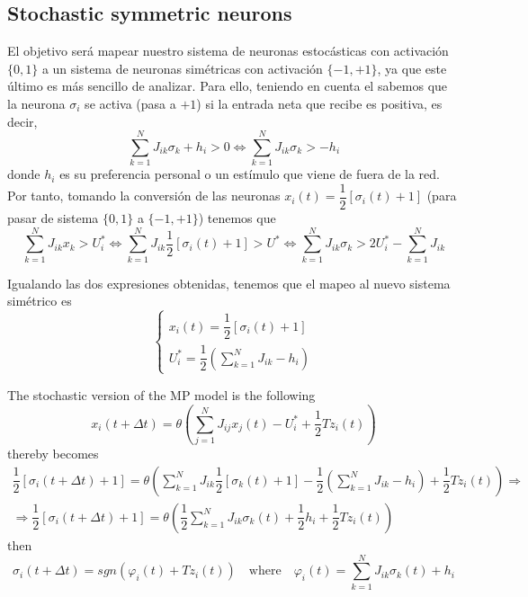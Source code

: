 \subsection{Stochastic symmetric neurons}
El objetivo será mapear nuestro sistema de neuronas estocásticas con activación $\{0,1\}$ a un sistema de neuronas simétricas con activación $\{-1, +1\}$, ya que este último es más sencillo de analizar. Para ello, teniendo en cuenta el  sabemos que la neurona $\sigma_i$ se activa (pasa a $+1$) si la entrada neta que recibe es positiva, es decir, 
\begin{equation*}
    \sum\limits_{k=1}^{N} J_{ik} \sigma_k  +h_i>0 \Longleftrightarrow \sum\limits_{k=1}^{N} J_{ik} \sigma_k > -h_i
\end{equation*}
donde $h_i$ es su preferencia personal o un estímulo que viene de fuera de la red. Por tanto, tomando la conversión de las neuronas $x_i(t) = \dfrac{1}{2}[\sigma_i(t)+1]$ (para pasar de sistema $\{0,1\}$ a $\{-1,+1\}$) tenemos que
\begin{equation*}
    \sum\limits_{k=1}^{N} J_{ik} x_k > U_i^* \iff \sum\limits_{k=1}^{N} J_{ik} \dfrac{1}{2}[\sigma_i(t)+1] > U^* \Longleftrightarrow \sum\limits_{k=1}^{N} J_{ik} \sigma_k > 2U_i^* - \sum\limits_{k=1}^{N} J_{ik}
\end{equation*}

\noindent
Igualando las dos expresiones obtenidas, tenemos que el mapeo al nuevo sistema simétrico es 
\begin{equation}\label{eq:mapeoIsingModel}
    \left\{
    \begin{array}{l}
        x_i(t) = \dfrac{1}{2}[\sigma_i(t)+1] \\
        U_i^* = \dfrac{1}{2}\left( \sum\limits_{k=1}^{N} J_{ik} - h_i \right)
    \end{array}\right.
\end{equation}


\noindent
The stochastic version of the MP model is the following
\begin{equation*}
    x_i (t + \Delta t) = \theta\left( \sum_{j=1}^{N} J_{ij} x_j (t) - U_i^* + \dfrac{1}{2} T z_i (t) \right)
\end{equation*}
thereby becomes
\begin{align*}
    \dfrac{1}{2}[\sigma_i (t + \Delta t) + 1] = \theta\left( \sum_{k=1}^{N} J_{ik} \dfrac{1}{2}[\sigma_k (t) + 1] - \dfrac{1}{2}\left( \sum_{k=1}^{N} J_{ik} - h_i \right) + \dfrac{1}{2} T z_i (t) \right) \Longrightarrow \\
    \Longrightarrow \dfrac{1}{2}[\sigma_i (t + \Delta t) + 1] = \theta\left( \dfrac{1}{2} \sum_{k=1}^{N} J_{ik} \sigma_k (t) + \dfrac{1}{2}h_i + \dfrac{1}{2}T z_i (t) \right)
\end{align*}
then
\begin{equation*}
    \sigma_i (t + \Delta t) = sgn\left( \varphi_i (t) + T z_i (t) \right) \quad \text{where} \quad \varphi_i (t) = \sum_{k=1}^{N} J_{ik} \sigma_k (t) + h_i
\end{equation*}

